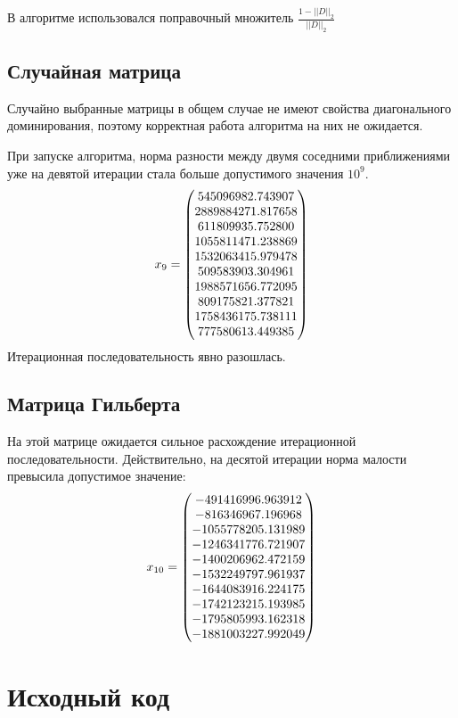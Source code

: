 \documentclass[../../report.tex]{subfiles}
\begin{document}
В алгоритме использовался поправочный множитель $\frac{1 - ||D||_2}{||D||_2}$

\subsection{Случайная матрица}
Случайно выбранные матрицы в общем случае не имеют свойства диагонального доминирования, 
поэтому корректная работа алгоритма на них не ожидается.

При запуске алгоритма, норма разности между двумя соседними приближениями 
уже на девятой итерации стала больше допустимого значения $10^9$. \\
\[
x_{9} = \randomResult
\]
Итерационная последовательность явно разошлась.

\subsection{Матрица Гильберта}
На этой матрице ожидается сильное расхождение итерационной последовательности. 
Действительно, на десятой итерации норма малости превысила допустимое значение:
\[
x_{10} = \hilbertResult
\]
\section{Исходный код}
\end{document}

